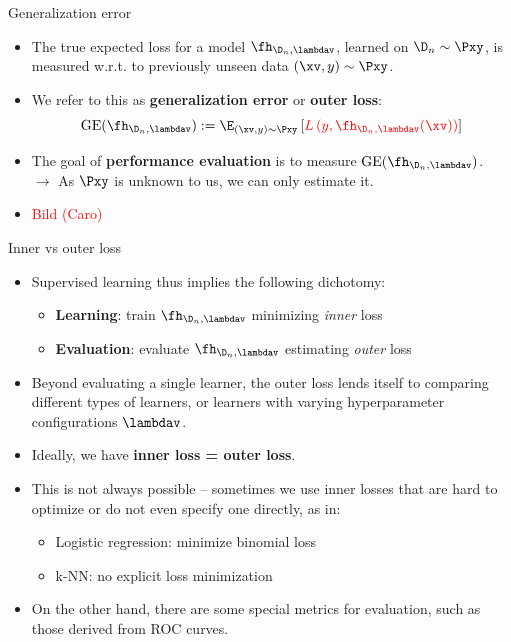 \documentclass[11pt,compress,t,notes=noshow, xcolor=table]{beamer}
\begin{document}
\begin{vbframe}{Generalization error}

\begin{itemize}
  \item The true expected loss for a model $\fh_{\D_n, \lambdav}$, learned on 
  $\D_n \sim \Pxy$, is measured w.r.t. to previously 
  unseen data $(\xv, y) \sim \Pxy$.
  \item We refer to this as \textbf{generalization error} or \textbf{outer 
  loss}:
  $$\mathrm{GE}(\fh_{\D_n, \lambdav}) := \E_{(\xv, y) \sim \Pxy}\left[ 
  \textcolor{red}{L\left(y, 
  \fh_{\D_n, \lambdav}(\xv)\right)} \right]$$
  \item The goal of \textbf{performance evaluation} is to measure 
  $\mathrm{GE}(\fh_{\D_n, \lambdav})$. \\
  $\rightarrow$ As $\Pxy$ is unknown to us, we can only estimate it.
  \item \textcolor{red}{Bild (Caro)}
\end{itemize}

\end{vbframe}


\begin{vbframe}{Inner vs outer loss}

\begin{itemize}
  \item Supervised learning thus implies the following dichotomy:
  \begin{itemize}
    \item \textbf{Learning}: train $\fh_{\D_n, \lambdav}$ minimizing 
    \textit{inner} loss
    \item \textbf{Evaluation}: evaluate $\fh_{\D_n, \lambdav}$ estimating
    \textit{outer} loss
  \end{itemize}
  \item Beyond evaluating a single learner, the outer loss lends itself to
  comparing different types of learners, or learners with varying hyperparameter
  configurations $\lambdav$.
\end{itemize}

\lz

\begin{itemize}
  \item Ideally, we have \textbf{inner loss = outer loss}.
  \item This is not always possible -- sometimes we use inner losses that are 
  hard to optimize or do not even specify one directly, as in:
  \begin{itemize}
    \item Logistic regression: minimize binomial loss
    \item k-NN: no explicit loss minimization
  \end{itemize}
  \item On the other hand, there are some special metrics for evaluation,
  such as those derived from ROC curves.
\end{itemize}

\end{vbframe}
\end{document}
